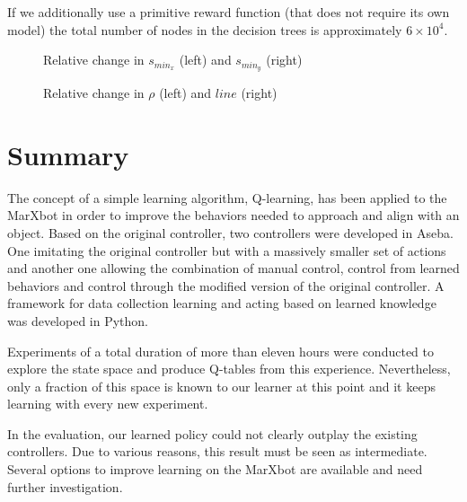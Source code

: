 If we additionally use a primitive reward function (that does not require its own model) the total number of nodes in the decision trees is approximately $6\times10^4$.

\begin{figure}
\center
\hfill
\caption{Relative change in $s_{min_x}$ (left) and $s_{min_y}$ (right)}
\end{figure}

\begin{figure}
\center
\hfill
\caption{Relative change in $\rho$ (left) and $line$ (right)}
\end{figure}


\section{Summary}
The concept of a simple learning algorithm, Q-learning, has been applied to the MarXbot in order to improve the behaviors needed to approach and align with an object. Based on the original controller, two controllers were developed in Aseba. One imitating the original controller but with a massively smaller set of actions and another one allowing the combination of manual control, control from learned behaviors and control through the modified version of the original controller. A framework for data collection learning and acting based on learned knowledge was developed in Python.

Experiments of a total duration of more than eleven hours were conducted to explore the state space and produce Q-tables from this experience. Nevertheless, only a fraction of this space is known to our learner at this point and it keeps learning with every new experiment.

In the evaluation, our learned policy could not clearly outplay the existing controllers. Due to various reasons, this result must be seen as intermediate. Several options to improve learning on the MarXbot are available and need further investigation.


%
